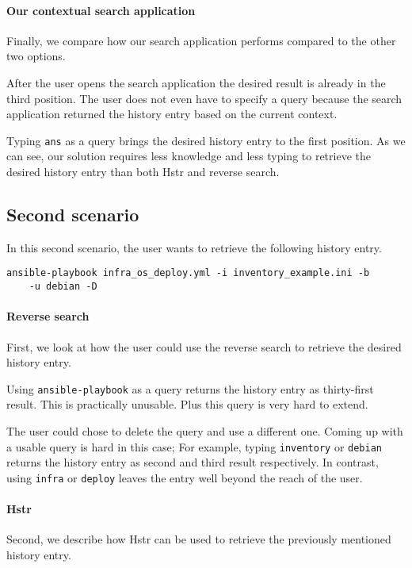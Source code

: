 \paragraph{Our contextual search application}
Finally, we compare how our search application performs compared to the other two options.

After the user opens the search application the desired result is already in the third position. The user does not even have to specify a query because the search application returned the history entry based on the current context.

Typing \verb|ans| as a query brings the desired history entry to the first position. As we can see, our solution requires less knowledge and less typing to retrieve the desired history entry than both Hstr and reverse search. 

\subsection{Second scenario}

In this second scenario, the user wants to retrieve the following history entry.

\begin{verbatim}
ansible-playbook infra_os_deploy.yml -i inventory_example.ini -b
    -u debian -D
\end{verbatim}


\paragraph{Reverse search} 
First, we look at how the user could use the reverse search to retrieve the desired history entry.

Using \verb|ansible-playbook| as a query returns the history entry as thirty-first result. This is practically unusable. Plus this query is very hard to extend.

The user could chose to delete the query and use a different one. Coming up with a usable query is hard in this case; For example, typing \verb|inventory| or \verb|debian| returns the history entry as second and third result respectively. In contrast, using \verb|infra| or \verb|deploy| leaves the entry well beyond the reach of the user. 

\paragraph{Hstr}
Second, we describe how Hstr can be used to retrieve the previously mentioned history entry.

